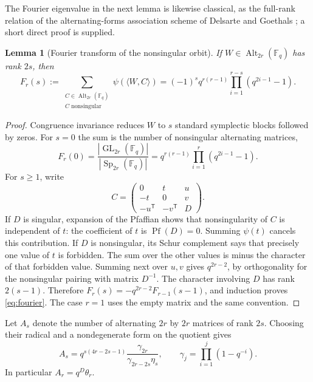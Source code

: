 \documentclass[11pt]{article}
\newtheorem{lemma}[theorem]{Lemma}
\newcommand{\F}{\mathbb F}
\newcommand{\Alt}{\operatorname{Alt}}
\newcommand{\Sp}{\operatorname{Sp}}
\newcommand{\Pf}{\operatorname{Pf}}
\newcommand{\GL}{\operatorname{GL}}
\begin{document}
The Fourier eigenvalue in the next lemma is likewise classical, as the full-rank relation of the alternating-forms association scheme of Delsarte and Goethals \cite{delsarte}; a short direct proof is supplied.
\begin{lemma}[Fourier transform of the nonsingular orbit]\label{lem:fourier}
If $W\in\Alt_{2r}(\F_q)$ has rank $2s$, then
\begin{equation}\label{eq:fourier}
 F_r(s):=\sum_{\substack{C\in\Alt_{2r}(\F_q)\\C\text{ nonsingular}}}
 \psi(\langle W,C\rangle)
 =(-1)^s q^{r(r-1)}\prod_{i=1}^{r-s}(q^{2i-1}-1).
\end{equation}
\end{lemma}
\begin{proof}
Congruence invariance reduces $W$ to $s$ standard symplectic blocks followed by zeros. For $s=0$ the sum is the number of nonsingular alternating matrices,
\[
 F_r(0)=\frac{|\GL_{2r}(\F_q)|}{|\Sp_{2r}(\F_q)|}
 =q^{r(r-1)}\prod_{i=1}^{r}(q^{2i-1}-1).
\]
For $s\ge1$, write
\[
 C=\begin{pmatrix}0&t&u\\-t&0&v\\-u^{\mathsf T}&-v^{\mathsf T}&D\end{pmatrix}.
\]
If $D$ is singular, expansion of the Pfaffian shows that nonsingularity of $C$ is independent of $t$: the coefficient of $t$ is $\Pf(D)=0$. Summing $\psi(t)$ cancels this contribution. If $D$ is nonsingular, its Schur complement says that precisely one value of $t$ is forbidden. The sum over the other values is minus the character of that forbidden value. Summing next over $u,v$ gives $q^{2r-2}$, by orthogonality for the nonsingular pairing with matrix $D^{-1}$. The character involving $D$ has rank $2(s-1)$. Therefore
$F_r(s)=-q^{2r-2}F_{r-1}(s-1)$, and induction proves \eqref{eq:fourier}. The case $r=1$ uses the empty matrix and the same convention.
\end{proof}

Let $A_s$ denote the number of alternating $2r$ by $2r$ matrices of rank $2s$. Choosing their radical and a nondegenerate form on the quotient gives
\begin{equation}\label{eq:rank-count}
 A_s=q^{s(4r-2s-1)}
 \frac{\gamma_{2r}}{\gamma_{2r-2s}\eta_s},
 \qquad\gamma_j=\prod_{i=1}^j(1-q^{-i}).
\end{equation}
In particular $A_r=q^D\theta_r$.
\end{document}
